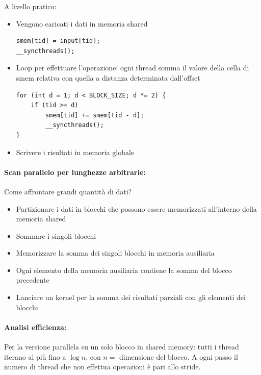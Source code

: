 A livello pratico:
\begin{itemize}
    \item Vengono caricati i dati in memoria shared
    \begin{verbatim}
smem[tid] = input[tid];
__syncthreads();
    \end{verbatim}
    
    \item Loop per effettuare l'operazione: ogni thread somma il valore della cella di smem relativa con quella a distanza determinata dall'offset
    \begin{verbatim}
for (int d = 1; d < BLOCK_SIZE; d *= 2) {
    if (tid >= d)
        smem[tid] += smem[tid - d];
        __syncthreads();
}
    \end{verbatim}
    
    \item Scrivere i risultati in memoria globale
\end{itemize}

\paragraph{Scan parallelo per lunghezze arbitrarie:} Come affrontare grandi quantità di dati? 
\begin{itemize}
    \item Partizionare i dati in blocchi che possono essere memorizzati all'interno della memoria shared
    
    \item Sommare i singoli blocchi 
    
    \item Memorizzare la somma dei singoli blocchi in memoria ausiliaria
    
    \item Ogni elemento della memoria ausiliaria contiene la somma del blocco precedente
    
    \item Lanciare un kernel per la somma dei risultati parziali con gli elementi dei blocchi
\end{itemize}

\paragraph{Analisi efficienza:} Per la versione parallela su un solo blocco in shared memory: tutti i thread iterano al più fino a $\log n$, con $n =$ dimensione del blocco. A ogni passo il numero di thread che non effettua operazioni è pari allo stride.

